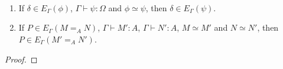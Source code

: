 {\begin{code}
%
\\
\>  \AgdaSymbol{:}  \AgdaSymbol{\{}\AgdaSymbol{\}} \AgdaSymbol{\{} \AgdaSymbol{:}  \AgdaSymbol{\}} \AgdaSymbol{\{} \AgdaSymbol{:}  \AgdaSymbol{\}} \AgdaSymbol{\{}\AgdaSymbol{\}} \AgdaSymbol{\{}\AgdaSymbol{\}} \<%
\\
\>[12]\<[19]%
\>[19]   \AgdaSymbol{(} \AgdaSymbol{:}   \AgdaSymbol{)} \AgdaSymbol{(} \AgdaSymbol{:}  \AgdaSymbol{)}                   \AgdaSymbol{(} \AgdaSymbol{(}   \AgdaSymbol{)} \AgdaSymbol{))} \<%
\\
\>[12]\<[19]%
\>[19]  \AgdaSymbol{(}  \AgdaSymbol{)} \<%
\end{code}
}

\begin{lm}$ $
\label{lm:conv-compute}
\begin{enumerate}
\item
If $\delta \in E_\Gamma(\phi)$, $\Gamma \vdash \psi : \Omega$ and $\phi \simeq \psi$, then $\delta \in E_\Gamma(\psi)$.
\item
If $P \in E_\Gamma(M =_A N)$, $\Gamma \vdash M' : A$, $\Gamma \vdash N' : A$, $M \simeq M'$ and $N \simeq N'$,
then $P \in E_\Gamma(M' =_A N')$.
\end{enumerate}
\end{lm}

\begin{proof}

\end{proof}

